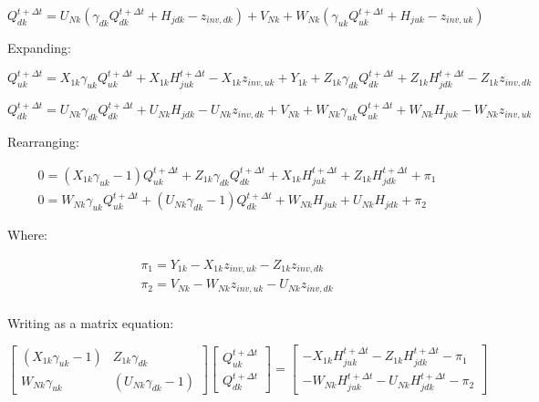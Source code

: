 \documentclass[11pt]{article}
\begin{document}
\begin{equation}
  Q_{dk}^{t + \Delta t} = U_{Nk} (\gamma_{dk} Q_{dk}^{t + \Delta t} + H_{jdk} - z_{inv, dk})
  + V_{Nk} + W_{Nk} (\gamma_{uk} Q_{uk}^{t + \Delta t} + H_{juk} - z_{inv, uk})
\end{equation}

Expanding:

\begin{equation}
   Q_{uk}^{t + \Delta t} = X_{1k} \gamma_{uk} Q_{uk}^{t + \Delta t} + X_{1k} H_{juk}^{t + \Delta t} - X_{1k} z_{inv, uk} + Y_{1k} + Z_{1k} \gamma_{dk} Q_{dk}^{t + \Delta t} + Z_{1k} H_{jdk}^{t + \Delta t} - Z_{1k} z_{inv, dk}
\end{equation}

\begin{equation}
  Q_{dk}^{t + \Delta t} = U_{Nk} \gamma_{dk} Q_{dk}^{t + \Delta t} + U_{Nk} H_{jdk} - U_{Nk} z_{inv, dk}
  + V_{Nk} + W_{Nk} \gamma_{uk} Q_{uk}^{t + \Delta t} + W_{Nk} H_{juk} - W_{Nk} z_{inv, uk}
\end{equation}

Rearranging:

\begin{align}
   0 = ( X_{1k} \gamma_{uk} - 1) Q_{uk}^{t + \Delta t} + Z_{1k} \gamma_{dk} Q_{dk}^{t + \Delta t} + X_{1k} H_{juk}^{t + \Delta t} + Z_{1k} H_{jdk}^{t + \Delta t} + \pi_1 \\
   0 = W_{Nk} \gamma_{uk} Q_{uk}^{t + \Delta t} + (U_{Nk} \gamma_{dk} - 1) Q_{dk}^{t + \Delta t} + W_{Nk} H_{juk} + U_{Nk} H_{jdk} + \pi_2
\end{align}

Where:

\begin{align}
 \pi_1 = Y_{1k} - X_{1k} z_{inv, uk} - Z_{1k} z_{inv, dk} \\ 
 \pi_2 = V_{Nk} - W_{Nk} z_{inv, uk} - U_{Nk} z_{inv, dk} \\ 
\end{align}

Writing as a matrix equation:

\begin{equation}
  \begin{bmatrix}
    (X_{1k} \gamma_{uk} - 1) & Z_{1k} \gamma_{dk} \\
    W_{Nk} \gamma_{uk} & (U_{Nk} \gamma_{dk} - 1)
  \end{bmatrix}
  \begin{bmatrix}
   Q_{uk}^{t + \Delta t} \\ Q_{dk}^{t + \Delta t} 
  \end{bmatrix}
  =
  \begin{bmatrix}
   - X_{1k} H_{juk}^{t + \Delta t} - Z_{1k} H_{jdk}^{t + \Delta t} - \pi_1 \\ 
   - W_{Nk} H_{juk}^{t + \Delta t} - U_{Nk} H_{jdk}^{t + \Delta t} - \pi_2
  \end{bmatrix}
\end{equation}
\end{document}
